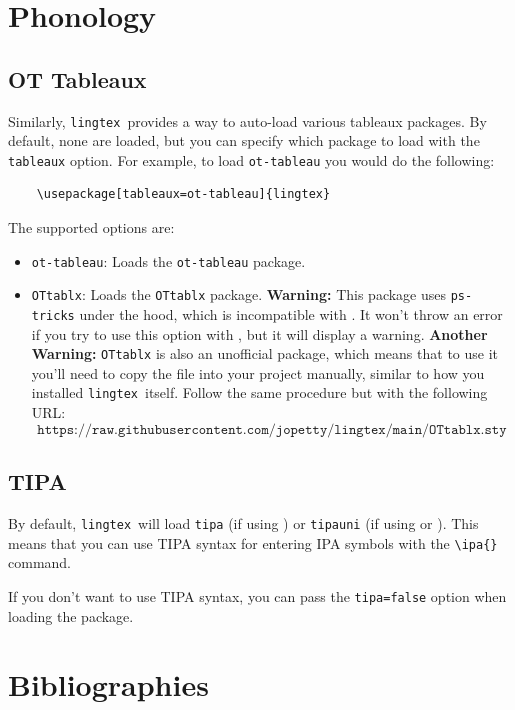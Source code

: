 \documentclass{article}
\def\lingtex{\texttt{lingtex}}
\begin{document}
\section{Phonology} \label{sec:phonology}

\subsection{OT Tableaux} \label{ssec:ot-tableaux}

Similarly, \lingtex\ provides a way to auto-load various tableaux packages. By default, none are loaded, but you can specify which package to load with the \verb|tableaux| option. For example, to load \texttt{ot-tableau} you would do the following:
\begin{verbatim}
    \usepackage[tableaux=ot-tableau]{lingtex}
\end{verbatim}
The supported options are:
\begin{itemize}
	\item \verb|ot-tableau|: Loads the \texttt{ot-tableau} package.
	\item \verb|OTtablx|: Loads the \texttt{OTtablx} package. \textbf{Warning:} This package uses \texttt{ps-tricks} under the hood, which is incompatible with . It won't throw an error if you try to use this option with , but it will display a warning. \textbf{Another Warning:} \texttt{OTtablx} is also an unofficial package, which means that to use it you'll need to copy the file into your project manually, similar to how you installed \lingtex\ itself. Follow the same procedure but with the following URL:
	      $$
		      \texttt{https://raw.githubusercontent.com/jopetty/lingtex/main/OTtablx.sty}
	      $$
\end{itemize}

\subsection{TIPA} \label{ssec:tipa}

By default, \lingtex\ will load \texttt{tipa} (if using ) or \texttt{tipauni} (if using  or ). This means that you can use TIPA syntax for entering IPA symbols with the \verb|\ipa{}| command.

If you don't want to use TIPA syntax, you can pass the \verb|tipa=false| option when loading the package.

\section{Bibliographies} \label{sec:bibliographies}
\end{document}
